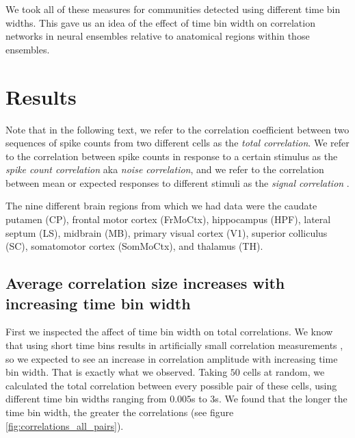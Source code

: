       We took all of these measures for communities detected using different time bin widths. This gave us an idea of the effect of time bin width on correlation networks in neural ensembles relative to anatomical regions within those ensembles.

\section{Results}

Note that in the following text, we refer to the correlation coefficient between two sequences of spike counts from two different cells as the \textit{total correlation}. We refer to the correlation between spike counts in response to a certain stimulus as the \textit{spike count correlation} aka \textit{noise correlation}, and we refer to the correlation between mean or expected responses to different stimuli as the \textit{signal correlation} \parencite{cohen2}.

The nine different brain regions from which we had data were the caudate putamen (CP), frontal motor cortex (FrMoCtx), hippocampus (HPF), lateral septum (LS), midbrain (MB), primary visual cortex (V1), superior colliculus (SC), somatomotor cortex (SomMoCtx), and thalamus (TH).

    \subsection{Average correlation size increases with increasing time bin width}
    First we inspected the affect of time bin width on total correlations. We know that using short time bins results in artificially small correlation measurements \parencite{cohen2}, so we expected to see an increase in correlation amplitude with increasing time bin width. That is exactly what we observed. Taking $50$ cells at random, we calculated the total correlation between every possible pair of these cells, using different time bin widths ranging from $0.005$s to $3$s. We found that the longer the time bin width, the greater the correlations (see figure \ref{fig:correlations_all_pairs}).

